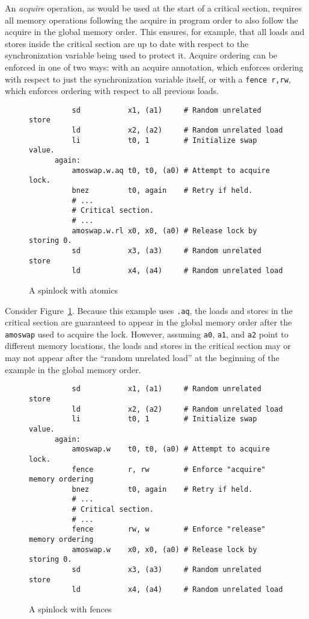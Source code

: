 An {\em acquire} operation, as would be used at the start of a critical section, requires all memory operations following the acquire in program order to also follow the acquire in the global memory order.
This ensures, for example, that all loads and stores inside the critical section are up to date with respect to the synchronization variable being used to protect it.
Acquire ordering can be enforced in one of two ways: with an acquire annotation, which enforces ordering with respect to just the synchronization variable itself, or with a {\tt fence r,rw}, which enforces ordering with respect to all previous loads.  

\begin{figure}[h!]
  \centering\small
  \begin{verbatim}
          sd           x1, (a1)     # Random unrelated store
          ld           x2, (a2)     # Random unrelated load
          li           t0, 1        # Initialize swap value.
      again:
          amoswap.w.aq t0, t0, (a0) # Attempt to acquire lock.
          bnez         t0, again    # Retry if held.
          # ...
          # Critical section.
          # ...
          amoswap.w.rl x0, x0, (a0) # Release lock by storing 0.
          sd           x3, (a3)     # Random unrelated store
          ld           x4, (a4)     # Random unrelated load
  \end{verbatim}
  \caption{A spinlock with atomics}
  \label{fig:litmus:spinlock_atomics}
\end{figure}

Consider Figure~\ref{fig:litmus:spinlock_atomics}.
Because this example uses {\tt .aq}, the loads and stores in the critical section are guaranteed to appear in the global memory order after the {\tt amoswap} used to acquire the lock.  However, assuming {\tt a0}, {\tt a1}, and {\tt a2} point to different memory locations, the loads and stores in the critical section may or may not appear after the ``random unrelated load'' at the beginning of the example in the global memory order.

\begin{figure}[h!]
  \centering\small
  \begin{verbatim}
          sd           x1, (a1)     # Random unrelated store
          ld           x2, (a2)     # Random unrelated load
          li           t0, 1        # Initialize swap value.
      again:
          amoswap.w    t0, t0, (a0) # Attempt to acquire lock.
          fence        r, rw        # Enforce "acquire" memory ordering
          bnez         t0, again    # Retry if held.
          # ...
          # Critical section.
          # ...
          fence        rw, w        # Enforce "release" memory ordering
          amoswap.w    x0, x0, (a0) # Release lock by storing 0.
          sd           x3, (a3)     # Random unrelated store
          ld           x4, (a4)     # Random unrelated load
  \end{verbatim}
  \caption{A spinlock with fences}
  \label{fig:litmus:spinlock_fences}
\end{figure}

